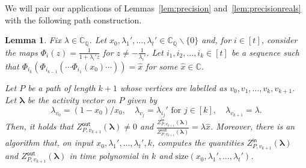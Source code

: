 \documentclass[11pt]{article}
\newtheorem{lemma}[theorem]{Lemma}
\def\Zin{Z^{\mathsf{in}}}
\def\Zout{Z^{\mathsf{out}}}
\def\Complex{\mathbb{C}}
\def\CQ{\mathbb{C}_{\mathbb{Q}}}
\newcommand{\size}[1]{\mathrm{size}(#1)}
\def\lambdab{\ensuremath{\boldsymbol{\lambda}}}
\begin{document}
We will pair our applications of Lemmas~\ref{lem:precision} and~\ref{lem:precisionreals}  with the following path construction.
\begin{lemma}\label{lem:pathpath}
Fix $\lambda \in \CQ$.
Let $x_0,\lambda_1',\hdots,\lambda_t'\in \CQ\backslash\{0\}$ and, for $i\in[t]$, consider the maps $\Phi_i(z)=\tfrac{1}{1+\lambda_i'z}$ for $z\neq -\tfrac{1}{\lambda_i'}$. Let $i_1,i_2,\hdots,i_k\in [t]$ be a sequence such that $\Phi_{i_k}(\Phi_{i_{k-1}}(\cdots\Phi_{i_1}(x_0)\cdots))=\hat{x}$ for some $\hat{x}\in \Complex$.

Let $P$ be a path of length $k+1$ whose vertices are labelled as $v_0,v_1,\hdots,v_k, v_{k+1}$. Let $\lambdab$ be the activity vector on $P$ given by
\[\lambda_{v_0}=(1-x_0)/x_0, \quad \lambda_{v_j}=\lambda_{i_j}' \mbox{ for $j\in[k]$}, \quad \lambda_{v_{k+1}}=\lambda.\]
Then, it holds that $\Zout_{P,v_{k+1}}(\lambdab)\neq 0$ and $\frac{\Zin_{P,v_{k+1}}(\lambdab)}{\Zout_{P,v_{k+1}}(\lambdab)}=\lambda\hat{x}$. Moreover, there is an algorithm that, on input $x_0,\lambda_1',\hdots,\lambda_t',k$, computes the quantities $\Zin_{P,v_{k+1}}(\lambdab)$ and $\Zout_{P,v_{k+1}}(\lambdab)$ in time polynomial in $k$ and $\size{x_0,\lambda_1',\hdots,\lambda_t'}$.
\end{lemma}
\end{document}
